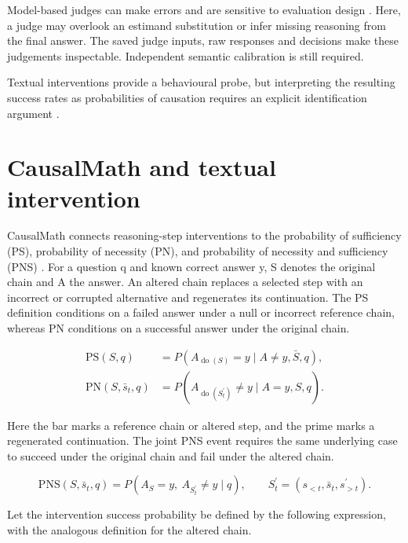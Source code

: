 Model-based judges can make errors and are sensitive to evaluation design \cite{NEURIPS2023_91f18a12}. Here, a judge may overlook an estimand substitution or infer missing reasoning from the final answer. The saved judge inputs, raw responses and decisions make these judgements inspectable. Independent semantic calibration is still required.

Textual interventions provide a behavioural probe, but interpreting the resulting success rates as probabilities of causation requires an explicit identification argument \cite{Lanham_2023_Faithfulness,Tian_2000}.

\section{CausalMath and textual intervention}\label{sec:2.5}

CausalMath \cite{NEURIPS2025_b7870bd4} connects reasoning-step interventions to the probability of sufficiency (PS), probability of necessity (PN), and probability of necessity and sufficiency (PNS) \cite{Tian_2000}. For a question q and known correct answer y, S denotes the original chain and A the answer. An altered chain replaces a selected step with an incorrect or corrupted alternative and regenerates its continuation. The PS definition conditions on a failed answer under a null or incorrect reference chain, whereas PN conditions on a successful answer under the original chain.

\begin{equation}\label{eq:2.1}
\begin{aligned}\mathrm{PS}(S,q)&=P(A_{\operatorname{do}(S)}=y\mid A\ne y,\bar S,q),\\\mathrm{PN}(S,\bar s_t,q)&=P(A_{\operatorname{do}(S_t^{\prime})}\ne y\mid A=y,S,q).\end{aligned}
\end{equation}

Here the bar marks a reference chain or altered step, and the prime marks a regenerated continuation. The joint PNS event requires the same underlying case to succeed under the original chain and fail under the altered chain.

\begin{equation}\label{eq:2.2}
\mathrm{PNS}(S,\bar s_t,q)=P\!\left(A_S=y,\ A_{S_t^{\prime}}\ne y\mid q\right),\qquad S_t^{\prime}=(s_{<t},\bar s_t,s_{>t}^{\prime}).
\end{equation}

Let the intervention success probability be defined by the following expression, with the analogous definition for the altered chain.


